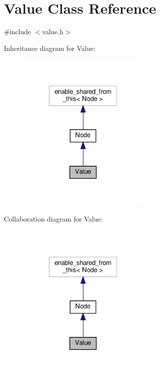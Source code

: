 \hypertarget{class_value}{}\section{Value Class Reference}
\label{class_value}


{\ttfamily \#include $<$value.\+h$>$}



Inheritance diagram for Value\+:\nopagebreak
\begin{figure}[H]
\begin{center}
\leavevmode
\includegraphics[width=184pt]{d0/d12/class_value__inherit__graph}
\end{center}
\end{figure}


Collaboration diagram for Value\+:\nopagebreak
\begin{figure}[H]
\begin{center}
\leavevmode
\includegraphics[width=184pt]{db/d2d/class_value__coll__graph}
\end{center}
\end{figure}
